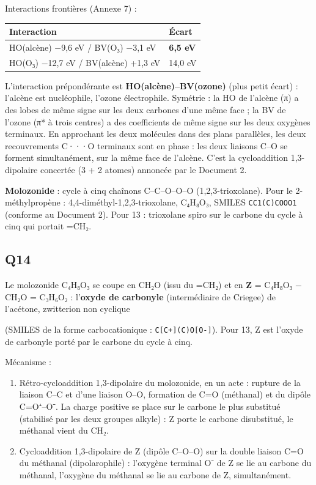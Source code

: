 \documentclass[11pt,a4paper]{article}
\providecommand{\tightlist}{\setlength{\itemsep}{0pt}\setlength{\parskip}{0pt}}
\newcommand{\equationajustee}[1]{%
  \sbox{\boiteequation}{$\displaystyle #1$}%
  \ifdim\wd\boiteequation>\linewidth
    \[\resizebox{\linewidth}{!}{\usebox{\boiteequation}}\]%
  \else
    \[#1\]%
  \fi}
\begin{document}
Interactions frontières (Annexe 7) :

\begin{longtable}[]{@{}ll@{}}
\toprule\noalign{}
Interaction & Écart \\
\midrule\noalign{}
\endhead
\bottomrule\noalign{}
\endlastfoot
HO(alcène) −9,6 eV / BV(O₃) −3,1 eV & \textbf{6,5 eV} \\
HO(O₃) −12,7 eV / BV(alcène) +1,3 eV & 14,0 eV \\
\end{longtable}

L'interaction prépondérante est \textbf{HO(alcène)--BV(ozone)} (plus petit écart) : l'alcène est nucléophile, l'ozone électrophile. Symétrie : la HO de l'alcène (π) a des lobes de même signe sur les deux carbones d'une même face ; la BV de l'ozone (π* à trois centres) a des coefficients de même signe sur les deux oxygènes terminaux. En approchant les deux molécules dans des plans parallèles, les deux recouvrements C···O terminaux sont en phase : les deux liaisons C--O se forment simultanément, sur la même face de l'alcène. C'est la cycloaddition 1,3-dipolaire concertée (3 + 2 atomes) annoncée par le Document 2.

\textbf{Molozonide} : cycle à cinq chaînons C--C--O--O--O (1,2,3-trioxolane). Pour le 2-méthylpropène : 4,4-\allowbreak{}diméthyl-\allowbreak{}1,2,3-\allowbreak{}trioxolane, C₄H₈O₃, SMILES \texttt{CC1(C)COOO1} (conforme au Document 2). Pour 13 : trioxolane spiro sur le carbone du cycle à cinq qui portait =CH₂.

\hypertarget{q14}{%
\subsection{Q14}\label{q14}}

Le molozonide C₄H₈O₃ se coupe en CH₂O (issu du =CH₂) et en \textbf{Z} = C₄H₈O₃ − CH₂O = C₃H₆O₂ : l'\textbf{oxyde de carbonyle} (intermédiaire de Criegee) de l'acétone, zwitterion non cyclique

\equationajustee{(\mathrm{CH_3})_2\mathrm{C}{=}\overset{+}{\mathrm{O}}{-}\mathrm{O^-}\;\longleftrightarrow\;(\mathrm{CH_3})_2\overset{+}{\mathrm{C}}{-}\mathrm{O}{-}\mathrm{O^-}}

(SMILES de la forme carbocationique : \texttt{C{[}C+{]}(C)O{[}O-{]}}). Pour 13, Z est l'oxyde de carbonyle porté par le carbone du cycle à cinq.

Mécanisme :

\begin{enumerate}
\def\labelenumi{\arabic{enumi}.}
\tightlist
\item
  Rétro-cycloaddition 1,3-dipolaire du molozonide, en un acte : rupture de la liaison C--C et d'une liaison O--O, formation de C=O (méthanal) et du dipôle C=O⁺--O⁻. La charge positive se place sur le carbone le plus substitué (stabilisé par les deux groupes alkyle) : Z porte le carbone disubstitué, le méthanal vient du CH₂.
\item
  Cycloaddition 1,3-dipolaire de Z (dipôle C--O--O) sur la double liaison C=O du méthanal (dipolarophile) : l'oxygène terminal O⁻ de Z se lie au carbone du méthanal, l'oxygène du méthanal se lie au carbone de Z, simultanément.
\end{enumerate}
\end{document}
